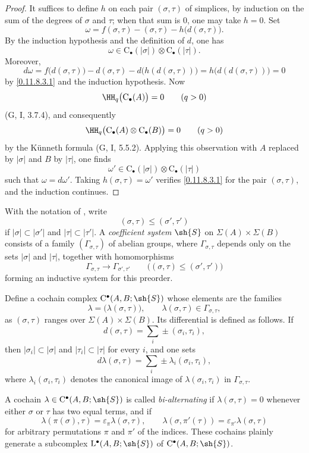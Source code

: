 \begin{proof}
It suffices to define $h$ on each pair $(\sigma,\tau)$ of simplices, by
induction on the sum of the degrees of $\sigma$ and $\tau$; when that sum
is $0$, one may take $h=0$.
Set
\[
  \omega
  =
  f(\sigma,\tau)-(\sigma,\tau)-h\bigl(d(\sigma,\tau)\bigr).
\]
By the induction hypothesis and the definition of $d$, one has
\[
  \omega
  \in
  \mathrm{C}_\bullet(|\sigma|)
  \otimes
  \mathrm{C}_\bullet(|\tau|).
\]
Moreover,
\[
  d\omega
  =
  f\bigl(d(\sigma,\tau)\bigr)
  -d(\sigma,\tau)
  -d\bigl(h(d(\sigma,\tau))\bigr)
  =
  h\bigl(d(d(\sigma,\tau))\bigr)
  =
  0
\]
by \eqref{0.11.8.3.1} and the induction hypothesis.
Now
\[
  \HH_q\bigl(\mathrm{C}_\bullet(A)\bigr)=0
  \qquad(q>0)
\]
(G, I, 3.7.4), and consequently
\[
  \HH_q\bigl(
    \mathrm{C}_\bullet(A)\otimes\mathrm{C}_\bullet(B)
  \bigr)=0
  \qquad(q>0)
\]
by the K\"unneth formula (G, I, 5.5.2).
Applying this observation with $A$ replaced by $|\sigma|$ and $B$ by
$|\tau|$, one finds
\[
  \omega'
  \in
  \mathrm{C}_\bullet(|\sigma|)
  \otimes
  \mathrm{C}_\bullet(|\tau|)
\]
such that $\omega=d\omega'$.
Taking $h(\sigma,\tau)=\omega'$ verifies \eqref{0.11.8.3.1} for the pair
$(\sigma,\tau)$, and the induction continues.
\end{proof}

\begin{env}[11.8.4]
\label{0.11.8.4}
With the notation of , write
\[
  (\sigma,\tau)\leq(\sigma',\tau')
\]
if $|\sigma|\subset|\sigma'|$ and $|\tau|\subset|\tau'|$.
A \emph{coefficient system} $\sh{S}$ on
$\Sigma(A)\times\Sigma(B)$ consists of a family
$(\Gamma_{\sigma,\tau})$ of abelian groups, where
$\Gamma_{\sigma,\tau}$ depends only on the sets $|\sigma|$ and
$|\tau|$, together with homomorphisms
\[
  \Gamma_{\sigma,\tau}
  \longrightarrow
  \Gamma_{\sigma',\tau'}
  \qquad
  \bigl((\sigma,\tau)\leq(\sigma',\tau')\bigr)
\]
forming an inductive system for this preorder.

Define a cochain complex $\mathrm{C}^\bullet(A,B;\sh{S})$ whose elements
are the families
\[
  \lambda=\bigl(\lambda(\sigma,\tau)\bigr),
  \qquad
  \lambda(\sigma,\tau)\in\Gamma_{\sigma,\tau},
\]
as $(\sigma,\tau)$ ranges over $\Sigma(A)\times\Sigma(B)$.
Its differential is defined as follows.
If
\[
  d(\sigma,\tau)=\sum_i\pm(\sigma_i,\tau_i),
\]
then $|\sigma_i|\subset|\sigma|$ and $|\tau_i|\subset|\tau|$ for every
$i$, and one sets
\[
  d\lambda(\sigma,\tau)
  =
  \sum_i\pm\lambda_i(\sigma_i,\tau_i),
\]
where $\lambda_i(\sigma_i,\tau_i)$ denotes the canonical image of
$\lambda(\sigma_i,\tau_i)$ in $\Gamma_{\sigma,\tau}$.

A cochain $\lambda\in\mathrm{C}^\bullet(A,B;\sh{S})$ is called
\emph{bi-alternating} if $\lambda(\sigma,\tau)=0$ whenever either
$\sigma$ or $\tau$ has two equal terms, and if
\[
  \lambda(\pi(\sigma),\tau)
  =
  \varepsilon_\pi\lambda(\sigma,\tau),
  \qquad
  \lambda(\sigma,\pi'(\tau))
  =
  \varepsilon_{\pi'}\lambda(\sigma,\tau)
\]
for arbitrary permutations $\pi$ and $\pi'$ of the indices.
These cochains plainly generate a subcomplex
$\mathrm{L}^\bullet(A,B;\sh{S})$ of
$\mathrm{C}^\bullet(A,B;\sh{S})$.
\end{env}

